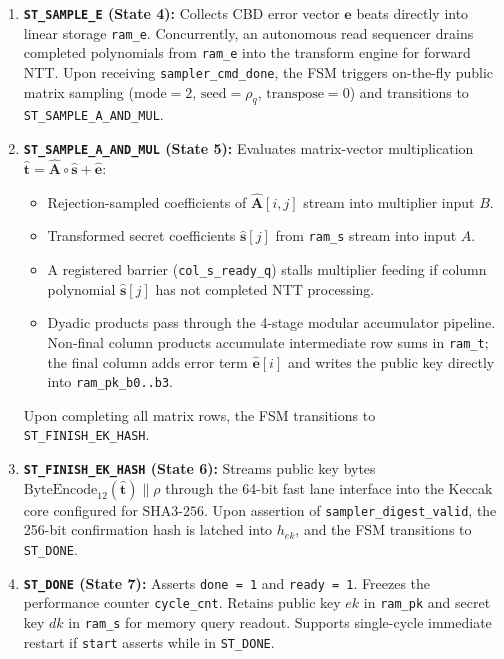 \begin{enumerate}
    \item \textbf{\texttt{ST\_SAMPLE\_E} (State 4):} Collects CBD error vector $\mathbf{e}$ beats directly into linear storage \texttt{ram\_e}. Concurrently, an autonomous read sequencer drains completed polynomials from \texttt{ram\_e} into the transform engine for forward NTT. Upon receiving \texttt{sampler\_cmd\_done}, the FSM triggers on-the-fly public matrix sampling ($\text{mode} = 2$, $\text{seed} = \rho_q$, $\text{transpose} = 0$) and transitions to \texttt{ST\_SAMPLE\_A\_AND\_MUL}.
    \item \textbf{\texttt{ST\_SAMPLE\_A\_AND\_MUL} (State 5):} Evaluates matrix-vector multiplication $\hat{\mathbf{t}} = \hat{\mathbf{A}} \circ \hat{\mathbf{s}} + \hat{\mathbf{e}}$:
    \begin{itemize}
        \item Rejection-sampled coefficients of $\hat{\mathbf{A}}[i, j]$ stream into multiplier input $B$.
        \item Transformed secret coefficients $\hat{\mathbf{s}}[j]$ from \texttt{ram\_s} stream into input $A$.
        \item A registered barrier (\texttt{col\_s\_ready\_q}) stalls multiplier feeding if column polynomial $\hat{\mathbf{s}}[j]$ has not completed NTT processing.
        \item Dyadic products pass through the 4-stage modular accumulator pipeline. Non-final column products accumulate intermediate row sums in \texttt{ram\_t}; the final column adds error term $\hat{\mathbf{e}}[i]$ and writes the public key directly into \texttt{ram\_pk\_b0..b3}.
    \end{itemize}
    Upon completing all matrix rows, the FSM transitions to \texttt{ST\_FINISH\_EK\_HASH}.
    \item \textbf{\texttt{ST\_FINISH\_EK\_HASH} (State 6):} Streams public key bytes $\text{ByteEncode}_{12}(\hat{\mathbf{t}}) \parallel \rho$ through the 64-bit fast lane interface into the Keccak core configured for $\text{SHA3-256}$. Upon assertion of \texttt{sampler\_digest\_valid}, the 256-bit confirmation hash is latched into $h_{ek}$, and the FSM transitions to \texttt{ST\_DONE}.
    \item \textbf{\texttt{ST\_DONE} (State 7):} Asserts \texttt{done = 1} and \texttt{ready = 1}. Freezes the performance counter \texttt{cycle\_cnt}. Retains public key $ek$ in \texttt{ram\_pk} and secret key $dk$ in \texttt{ram\_s} for memory query readout. Supports single-cycle immediate restart if \texttt{start} asserts while in \texttt{ST\_DONE}.

\end{enumerate}

